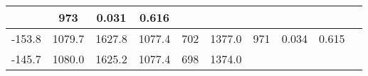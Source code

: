 \documentclass[a4paper,10pt]{article}
\begin{document}
\begin{longtable}{
     |
%    
    c|
%    
    c|
%    
    c|
%    
    c|
%    
    c|
%    
    c|
%    
    c|
%    
    c|
%    
    c|
%    
    c|
%    
    }
%        
        & 973
%        

%        

%        
        & 0.031
%        

%        

%        
        & 0.616
%        

%        
        \\
        \hline

        

%        

%        
        -153.8
%        

%        

%        
        & 1079.7
%        

%        

%        
        & 1627.8
%        

%        

%        
        & 1077.4
%        

%        

%        
        & 702
%        

%        

%        
        & 1377.0
%        

%        

%        
        & 971
%        

%        

%        
        & 0.034
%        

%        

%        
        & 0.615
%        

%        
        \\
        \hline

        

%        

%        
        -145.7
%        

%        

%        
        & 1080.0
%        

%        

%        
        & 1625.2
%        

%        

%        
        & 1077.4
%        

%        

%        
        & 698
%        

%        

%        
        & 1374.0
%        

%        


\end{longtable}
\end{document}
